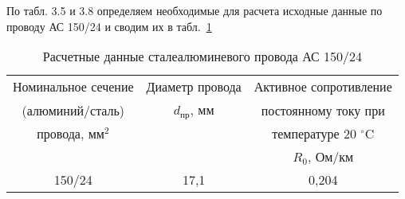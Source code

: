 По табл. 3.5 и 3.8 \cite{файбисович} определяем необходимые для расчета исходные данные по проводу АС 150/24 и сводим их в табл.~\ref{tab:tabl3}

\begin{table}[H]
	\caption{Расчетные данные сталеалюминевого провода АС 150/24}
	\begin{tabular}{|c|c|c|}
		\hline
		Номинальное сечение & Диаметр провода  & Активное сопротивление \\
		(алюминий/сталь) & $d_{\text{пр}}$, мм & постоянному току при \\
		провода, $\text{мм}^2$ & & температуре 20 $^{\circ}$C \\
		 & & $R_0$, Ом/км \\
		\hline
		150/24 & 17,1 & 0,204 \\
		\hline
	\end{tabular}
	\label{tab:tabl3}
\end{table}


\renewcommand{\thefigure}{\arabic{chapter}.\arabic{figure}} %
\renewcommand{\thetable}{\arabic{chapter}.\arabic{table}} %

